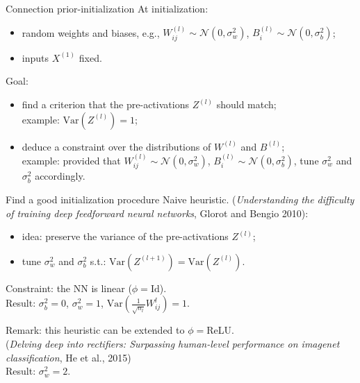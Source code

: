 \documentclass[9pt]{beamer}
\begin{document}
\begin{frame}{Connection prior-initialization}
	\alert{At initialization:}
	\begin{itemize}
		\item random weights and biases, e.g., $W^{(l)}_{ij} \sim \mathcal{N}(0, \sigma_w^2)$, 
		$B^{(l)}_{i} \sim \mathcal{N}(0, \sigma_b^2)$;
		\item inputs $X^{(1)}$ fixed.
	\end{itemize} 

	\bigskip
	
	\alert{Goal:}
	\begin{itemize}
		\item find a criterion that the pre-activations $Z^{(l)}$ should match;  \\
			example: $\mathrm{Var}(Z^{(l)}) = 1$;  
		\item deduce a constraint over the distributions of $W^{(l)}$ and $B^{(l)}$;  \\
			example: provided that $W^{(l)}_{ij} \sim \mathcal{N}(0, \sigma_w^2)$, 
			$B^{(l)}_{i} \sim \mathcal{N}(0, \sigma_b^2)$, tune $\sigma_w^2$ and $\sigma_b^2$ accordingly.
	\end{itemize} 
\end{frame}


\begin{frame}{Find a good initialization procedure}
	\alert{Naive heuristic.} (\emph{Understanding the difficulty of training deep feedforward neural 
	networks}, Glorot and Bengio 2010):
	\begin{itemize}
		\item idea: preserve the variance of the pre-activations $Z^{(l)}$;
		\item tune $\sigma_w^2$ and $\sigma_b^2$ s.t.: $\mathrm{Var}(Z^{(l + 1)}) = 
		\mathrm{Var}(Z^{(l)})$. 
	\end{itemize}
	Constraint: the NN is linear ($\phi = \mathrm{Id}$).  \\
	Result: $\sigma_b^2 = 0$, $\sigma_w^2 = 1$, $\mathrm{Var}(\frac{1}{\sqrt{n_l}} W_{ij}^l) = 1$.

	
	\bigskip
	
	\alert{Remark:} this heuristic can be extended to $\phi = $ReLU. \\
	(\emph{Delving deep into rectifiers: Surpassing human-level performance on imagenet classification}, He et al.,  
	2015)  \\
	Result: $\sigma_w^2 = 2$.
\end{frame}
\end{document}
